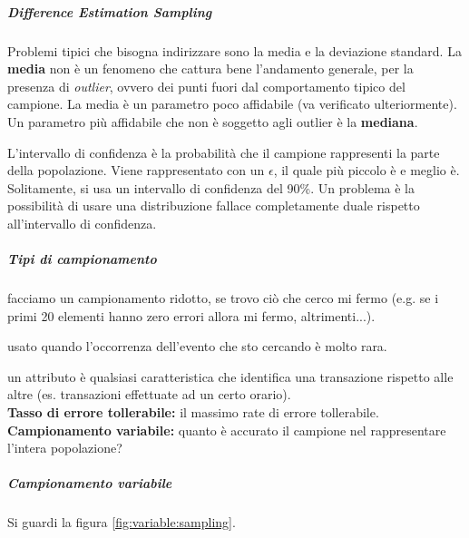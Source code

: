 \subparagraph*{Difference Estimation Sampling}

Problemi tipici che bisogna indirizzare sono la media e la deviazione standard.
La \textbf{media} non è un fenomeno che cattura bene l'andamento generale, per la
presenza di \textit{outlier}, ovvero dei punti fuori dal comportamento
tipico del campione.
La media è un parametro poco affidabile (va verificato ulteriormente). Un
parametro più affidabile che non è soggetto agli
outlier è la \textbf{mediana}.

L'intervallo di confidenza è la probabilità che il campione rappresenti la parte
della popolazione. Viene rappresentato con un $\epsilon$, il quale più piccolo è e
meglio è. Solitamente, si usa un intervallo di confidenza del 90\%. Un problema
è la possibilità di usare una distribuzione fallace completamente duale rispetto
all'intervallo di confidenza.


\subparagraph*{Tipi di campionamento}

 facciamo un campionamento ridotto, se trovo
ciò che cerco mi fermo (e.g. se i primi 20 elementi hanno zero errori allora mi fermo,
altrimenti...).

 usato quando l'occorrenza dell'evento che
sto cercando è molto rara.

 un attributo è qualsiasi
caratteristica che identifica una transazione rispetto alle altre (es.
transazioni effettuate ad un certo orario).\\
\newline
\textbf{Tasso di errore tollerabile:} il massimo rate di errore
tollerabile.\\
\newline
\textbf{Campionamento variabile:} quanto è accurato il campione nel rappresentare
l'intera popolazione?


\subparagraph{Campionamento variabile}

Si guardi la figura \ref{fig:variable:sampling}.

